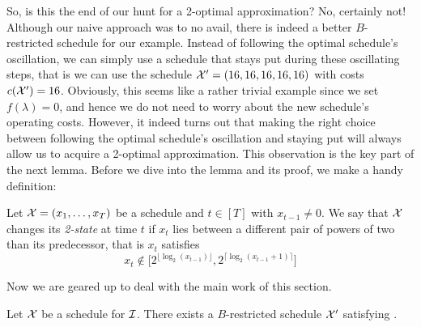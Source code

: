 So, is this the end of our hunt for a 2-optimal approximation? No, certainly not! Although our naive approach was to no avail, there is indeed a better $B$-restricted schedule for our example. Instead of following the optimal schedule's oscillation, we can simply use a schedule that stays put during these oscillating steps, that is we can use the schedule $\mathcal{X}'=(16,16,16,16,16)$ with costs $c(\mathcal{X}')=16$. Obviously, this seems like a rather trivial example since we set $f(\lambda)=0$, and hence we do not need to worry about the new schedule's operating costs. However, it indeed turns out that making the right choice between following the optimal schedule's oscillation and staying put will always allow us to acquire a 2-optimal approximation. This observation is the key part of the next lemma. Before we dive into the lemma and its proof, we make a handy definition:
\begin{defn}
Let $\mathcal{X}=(x_1,\dotsc,x_T)$ be a schedule and $t\in[T]$ with $x_{t-1}\neq 0$. We say that $\mathcal{X}$ changes its \emph{2-state} at time $t$ if $x_t$ lies between a different pair of powers of two than its predecessor, that is $x_t$ satisfies
\begin{equation*}
	x_t\notin\bigl[2^{\lfloor \log_2(x_{t-1})\rfloor},2^{\lceil \log_2(x_{t-1}+1)\rceil}\bigr]
\end{equation*}
\end{defn}
Now we are geared up to deal with the main work of this section.
\begin{lem}\label{lem:transform_schedule_approx_2}
Let $\mathcal{X}$ be a schedule for $\mathcal{I}$. There exists a $B$-restricted schedule $\mathcal{X}'$ satisfying .
\end{lem}

